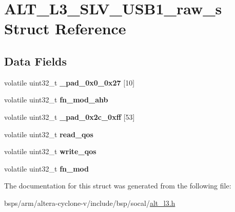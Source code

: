 \hypertarget{structALT__L3__SLV__USB1__raw__s}{}\section{A\+L\+T\+\_\+\+L3\+\_\+\+S\+L\+V\+\_\+\+U\+S\+B1\+\_\+raw\+\_\+s Struct Reference}
\label{structALT__L3__SLV__USB1__raw__s}
\subsection*{Data Fields}
\begin{DoxyCompactItemize}
\item 
\mbox{\label{structALT__L3__SLV__USB1__raw__s_a97859b789f751f3596177467d279d49c}} 
volatile uint32\+\_\+t {\bfseries \+\_\+pad\+\_\+0x0\+\_\+0x27} \mbox{[}10\mbox{]}
\item 
\mbox{\label{structALT__L3__SLV__USB1__raw__s_add7822728ebbf2b0d194fd4c2d18acd7}} 
volatile uint32\+\_\+t {\bfseries fn\+\_\+mod\+\_\+ahb}
\item 
\mbox{\label{structALT__L3__SLV__USB1__raw__s_a502052f62a350ebadebc401c11f6d9d5}} 
volatile uint32\+\_\+t {\bfseries \+\_\+pad\+\_\+0x2c\+\_\+0xff} \mbox{[}53\mbox{]}
\item 
\mbox{\label{structALT__L3__SLV__USB1__raw__s_a01e27438a309f5cb523cff1b49dc033b}} 
volatile uint32\+\_\+t {\bfseries read\+\_\+qos}
\item 
\mbox{\label{structALT__L3__SLV__USB1__raw__s_a94533b367960d5c7a283e71b9b121fd9}} 
volatile uint32\+\_\+t {\bfseries write\+\_\+qos}
\item 
\mbox{\label{structALT__L3__SLV__USB1__raw__s_a6401749ef25b9ffdef2de53cdcbb4f6b}} 
volatile uint32\+\_\+t {\bfseries fn\+\_\+mod}
\end{DoxyCompactItemize}


The documentation for this struct was generated from the following file\+:\begin{DoxyCompactItemize}
\item 
bsps/arm/altera-\/cyclone-\/v/include/bsp/socal/\mbox{\hyperlink{alt__l3_8h}{alt\+\_\+l3.\+h}}\end{DoxyCompactItemize}
